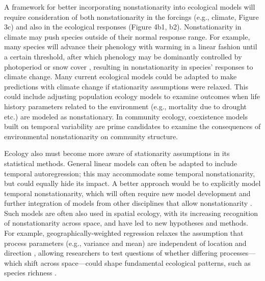 \documentclass[11pt,a4paper,oneside]{article}
\begin{document}
A framework for better incorporating nonstationarity into ecological models will require consideration of both nonstationarity in the forcings (e.g., climate, Figure 3c) and also in the ecological responses (Figure 4b1, b2). Nonstationarity in climate may push species outside of their normal response range. For example, many species will advance their phenology with warming in a linear fashion until a certain threshold, after which phenology may be dominantly controlled by photoperiod or snow cover \citep{Iler2013}, resulting in nonstationarity in species' responses to climate change. Many current ecological models could be adapted to make predictions with climate change if stationarity assumptions were relaxed. This could include adjusting population ecology models to examine outcomes when life history parameters related to the environment (e.g., mortality due to drought etc.) are modeled as nonstationary. In community ecology, coexistence models built on temporal variability \citep[e.g.,][]{Chesson:1997dz} are prime candidates to examine the consequences of environmental nonstationarity on community structure. 

Ecology also must become more aware of stationarity assumptions in its statistical methods. General linear models can often be adapted to include temporal autoregression; this may accommodate some temporal nonstationarity, but could equally hide its impact. A better approach would be to explicitly model temporal nonstationarity, which will often require new model development and further integration of models from other disciplines that allow nonstationarity \citep[e.g,][]{Grenfell:2001ox,lipp2002}. Such models are often also used in spatial ecology, with its increasing recognition of nonstationarity across space, and have led to new hypotheses and methods. For example, geographically-weighted regression relaxes the assumption that process parameters (e.g., variance and mean) are independent of location and direction \citep{Brunsdon:1998nx}, allowing researchers to test questions of whether differing processes---which shift across space---could shape fundamental ecological patterns, such as species richness \citep{davies2011}.\\  %
\end{document}
